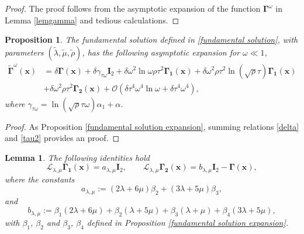 \documentclass[10pt,reqno,oneside]{amsart}%
\newtheorem{lem}{Lemma}[section]
\newtheorem{prop}{Proposition}[section]
\theoremstyle{definition}
\theoremstyle{remark}
\numberwithin{equation}{section}
\numberwithin{equation}{section}
\begin{document}
\begin{proof}
The proof follows from the asymptotic expansion of the function $\boldsymbol{\Gamma}^{\omega}$ in Lemma \ref{lemgamma} and tedious calculations.
\end{proof}
\begin{prop}\label{fundamental tilde solution expansion}
The fundamental solution defined in \eqref{fundamental solution}, with parameters $(\tilde{\lambda}, \tilde{\mu},\tilde{\rho})$, has the following asymptotic expansion for $\omega\ll1$,
\begin{align}
\tilde{\boldsymbol{\Gamma}}^{\omega}(\mathbf{x})&=\delta\boldsymbol{\Gamma}(\mathbf{x})+\delta\gamma_{\tau\omega}\mathbf{I}_2
+\delta\omega^2\ln\omega\rho\tau^2\boldsymbol{\Gamma_1}(\mathbf{x})+\delta\omega^2\rho\tau^2 \ln(\sqrt{\rho}\tau)\boldsymbol{\Gamma_{1}}(\mathbf{x})\nonumber \\
&+\delta\omega^2\rho\tau^2\boldsymbol{\Gamma_2}(\mathbf{x})
+\mathcal{O}(\delta\tau^4\omega^4\ln{\omega}+\delta\tau^4\omega^4),\nonumber
\end{align}
where $\gamma_{\tau\omega}=\ln (\sqrt{\rho}\tau\omega) \alpha_1+\alpha$.
\end{prop}
\begin{proof}
As Proposition \ref{fundamental solution expansion}, summing relations \eqref{delta} and \eqref{tau2} provides an proof.
\end{proof}
\begin{lem}\label{calculatelame}
The following identities hold
\begin{equation}
\mathcal{L}_{\lambda,\mu} \boldsymbol{\Gamma_1}(\mathbf{x})=a_{\lambda,\mu}\mathbf{I}_2,\quad\quad
\mathcal{L}_{\lambda,\mu} \boldsymbol{\Gamma_2}(\mathbf{x})=b_{\lambda,\mu}\mathbf{I}_2-\boldsymbol{\Gamma}(\mathbf{x}),\nonumber
\end{equation}
where the constants
\begin{equation}\label{lamea}
a_{\lambda,\mu}:=(2\lambda+6\mu)\beta_2+(3\lambda+5\mu)\beta_3,
\end{equation}
and
\begin{equation}\label{lameb}
b_{\lambda,\mu}:=\beta_{1}(2\lambda+6\mu)+\beta_{2}(\lambda+5\mu)+\beta_{3}(\lambda+\mu)+\beta_{4}(3\lambda+5\mu),
\end{equation}
with $\beta_{1}$, $\beta_{2}$ and $\beta_{3}$, $\beta_{4}$ defined in Proposition \ref{fundamental solution expansion}.
\end{lem}
\end{document}
